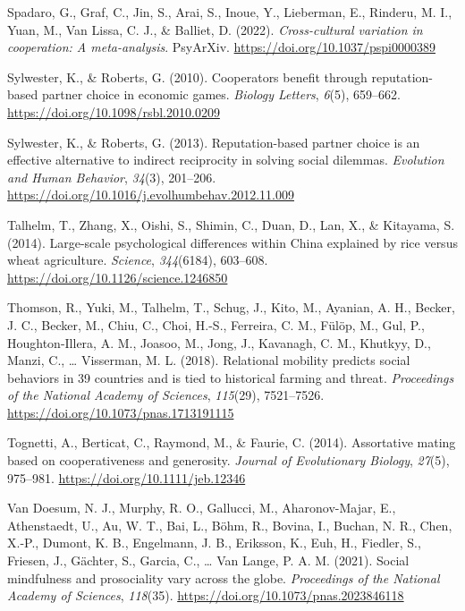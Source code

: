 \documentclass[
  man,floatsintext]{apa6}
\newlength{\cslhangindent}
\newlength{\cslentryspacingunit} %
\newenvironment{CSLReferences}[2] %
 {%
  \setlength{\parindent}{0pt}
  \ifodd #1
  \let\oldpar\par
  \def\par{\hangindent=\cslhangindent\oldpar}
  \fi
  \setlength{\parskip}{#2\cslentryspacingunit}
 }%
 {}
\begin{document}
\begin{CSLReferences}{1}{0}
\leavevmode{}%
Spadaro, G., Graf, C., Jin, S., Arai, S., Inoue, Y., Lieberman, E., Rinderu, M. I., Yuan, M., Van Lissa, C. J., \& Balliet, D. (2022). \emph{Cross-cultural variation in cooperation: A meta-analysis}. PsyArXiv. \url{https://doi.org/10.1037/pspi0000389}

\leavevmode{}%
Sylwester, K., \& Roberts, G. (2010). Cooperators benefit through reputation-based partner choice in economic games. \emph{Biology Letters}, \emph{6}(5), 659--662. \url{https://doi.org/10.1098/rsbl.2010.0209}

\leavevmode{}%
Sylwester, K., \& Roberts, G. (2013). Reputation-based partner choice is an effective alternative to indirect reciprocity in solving social dilemmas. \emph{Evolution and Human Behavior}, \emph{34}(3), 201--206. \url{https://doi.org/10.1016/j.evolhumbehav.2012.11.009}

\leavevmode{}%
Talhelm, T., Zhang, X., Oishi, S., Shimin, C., Duan, D., Lan, X., \& Kitayama, S. (2014). Large-scale psychological differences within {C}hina explained by rice versus wheat agriculture. \emph{Science}, \emph{344}(6184), 603--608. \url{https://doi.org/10.1126/science.1246850}

\leavevmode{}%
Thomson, R., Yuki, M., Talhelm, T., Schug, J., Kito, M., Ayanian, A. H., Becker, J. C., Becker, M., Chiu, C., Choi, H.-S., Ferreira, C. M., Fülöp, M., Gul, P., Houghton-Illera, A. M., Joasoo, M., Jong, J., Kavanagh, C. M., Khutkyy, D., Manzi, C., \ldots{} Visserman, M. L. (2018). Relational mobility predicts social behaviors in 39 countries and is tied to historical farming and threat. \emph{Proceedings of the National Academy of Sciences}, \emph{115}(29), 7521--7526. \url{https://doi.org/10.1073/pnas.1713191115}

\leavevmode{}%
Tognetti, A., Berticat, C., Raymond, M., \& Faurie, C. (2014). Assortative mating based on cooperativeness and generosity. \emph{Journal of Evolutionary Biology}, \emph{27}(5), 975--981. \url{https://doi.org/10.1111/jeb.12346}

\leavevmode{}%
Van Doesum, N. J., Murphy, R. O., Gallucci, M., Aharonov-Majar, E., Athenstaedt, U., Au, W. T., Bai, L., Böhm, R., Bovina, I., Buchan, N. R., Chen, X.-P., Dumont, K. B., Engelmann, J. B., Eriksson, K., Euh, H., Fiedler, S., Friesen, J., Gächter, S., Garcia, C., \ldots{} Van Lange, P. A. M. (2021). Social mindfulness and prosociality vary across the globe. \emph{Proceedings of the National Academy of Sciences}, \emph{118}(35). \url{https://doi.org/10.1073/pnas.2023846118}


\end{CSLReferences}
\end{document}
